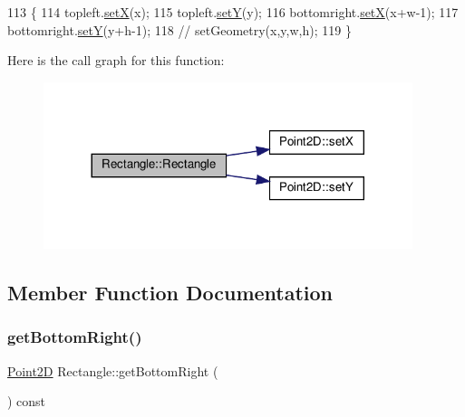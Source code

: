 \begin{DoxyCode}
113                                           \{
114         topleft.\hyperlink{classPoint2D_af268842e8f2e6072ffe345dc2f322046}{setX}(x);
115         topleft.\hyperlink{classPoint2D_a0e08240b54e6eaae92c979082da1c91c}{setY}(y);
116         bottomright.\hyperlink{classPoint2D_af268842e8f2e6072ffe345dc2f322046}{setX}(x+w-1);
117         bottomright.\hyperlink{classPoint2D_a0e08240b54e6eaae92c979082da1c91c}{setY}(y+h-1);
118         \textcolor{comment}{// setGeometry(x,y,w,h);}
119     \}
\end{DoxyCode}
Here is the call graph for this function\+:
\nopagebreak
\begin{figure}[H]
\begin{center}
\leavevmode
\includegraphics[width=305pt]{classRectangle_a1546993e9fc10b8d128f4a85ed68c653_cgraph}
\end{center}
\end{figure}


\subsection{Member Function Documentation}
\mbox{\label{classRectangle_a5f30a92f3fc197dda50d9e59995d3ac1}} 
\subsubsection{\texorpdfstring{get\+Bottom\+Right()}{getBottomRight()}}
{\footnotesize\ttfamily \hyperlink{classPoint2D}{Point2D} Rectangle\+::get\+Bottom\+Right (\begin{DoxyParamCaption}{ }\end{DoxyParamCaption}) const\hspace{0.3cm}{\ttfamily [inline]}}



